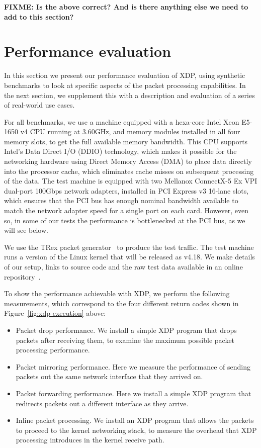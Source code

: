 \documentclass[10pt,sigconf]{acmart}
\begin{document}
\textbf{FIXME: Is the above correct? And is there anything else we need to add
  to this section?}

\section{Performance evaluation}
\label{sec:perf-eval}
In this section we present our performance evaluation of XDP, using synthetic
benchmarks to look at specific aspects of the packet processing capabilities. In
the next section, we supplement this with a description and evaluation of a
series of real-world use cases.

For all benchmarks, we use a machine equipped with a hexa-core Intel Xeon
E5-1650 v4 CPU running at 3.60GHz, and memory modules installed in all four
memory slots, to get the full available memory bandwidth. This CPU supports
Intel's Data Direct I/O (DDIO) technology, which makes it possible for the
networking hardware using Direct Memory Access (DMA) to place data directly into
the processor cache, which eliminates cache misses on subsequent processing of
the data. The test machine is equipped with two Mellanox ConnectX-5 Ex VPI
dual-port 100Gbps network adapters, installed in PCI Express v3 16-lane slots,
which ensures that the PCI bus has enough nominal bandwidth available to match
the network adapter speed for a single port on each card. However, even so, in
some of our tests the performance is bottlenecked at the PCI bus, as we will see
below.

We use the TRex packet generator~\cite{cisco18:_trex_traff_gener} to produce the
test traffic. The test machine runs a version of the Linux kernel that will
be released as v4.18. We make details of our setup, links to source code and the
raw test data available in an online repository~\cite{test-data}.

To show the performance achievable with XDP, we perform the following
measurements, which correspond to the four different return codes shown in
Figure~\ref{fig:xdp-execution} above:

\begin{itemize}
\item Packet drop performance. We install a simple XDP program that drops
  packets after receiving them, to examine the maximum possible packet
  processing performance.

\item Packet mirroring performance. Here we measure the performance of sending
  packets out the same network interface that they arrived on.

\item Packet forwarding performance. Here we install a simple XDP program that
  redirects packets out a different interface as they arrive.

\item Inline packet processing. We install an XDP program that allows the
  packets to proceed to the kernel networking stack, to measure the overhead
  that XDP processing introduces in the kernel receive path.
\end{itemize}
\end{document}
